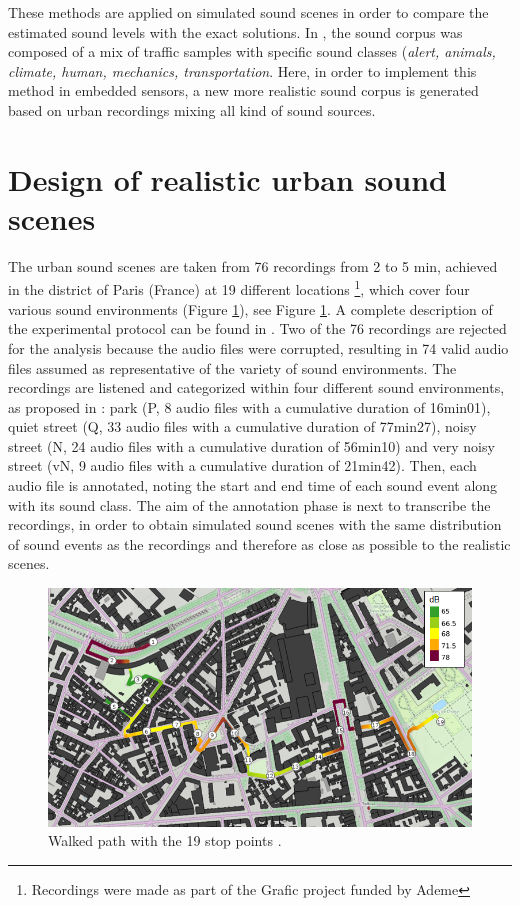 \documentclass[review,5p,twocolumn,sort&compress,times]{elsarticle}
\begin{document}
These methods are applied on simulated sound scenes in order to compare the estimated sound levels with the exact solutions. In \cite{}, the sound corpus was composed of a mix of traffic samples with specific sound classes (\textit{alert, animals, climate, human, mechanics, transportation}. Here, in order to implement this method in embedded sensors, a new more realistic sound corpus is generated based on urban recordings mixing all kind of sound sources.

\section{Design of realistic urban sound scenes}\label{part:urban_scene}

The urban sound scenes are taken from 76 recordings from 2 to 5 min, achieved in the  district of Paris (France) at 19 different locations \footnote{Recordings were made as part of the Grafic project funded by Ademe}, which cover four various sound environments (Figure \ref{fig:map_grafic}), see Figure \ref{fig:map_grafic}. A complete description of the experimental protocol can be found in \cite{aumond_modelling_2017}. Two of the 76 recordings are rejected for the analysis because the audio files were corrupted, resulting in 74 valid audio files assumed as representative of the variety of sound environments. The recordings are listened and categorized within four different sound environments, as proposed in \cite{can_describing_2015}: park (P, 8 audio files with a cumulative duration of 16min01), quiet street (Q, 33 audio files with a cumulative duration of 77min27), noisy street (N, 24 audio files with a cumulative duration of 56min10) and very noisy street (vN, 9 audio files with a cumulative duration of 21min42). Then, each audio file is annotated, noting the start and end time of each sound event along with its sound class. The aim of the annotation phase is next to transcribe the recordings, in order to obtain simulated sound scenes with the same distribution of sound events as the recordings and therefore as close as possible to the realistic scenes. 

\begin{figure}[t]
\centering
\includegraphics[width=\linewidth]{./figures/trajet_19pts.png}
\caption{Walked path with the 19 stop points  \cite{aumond_modelling_2017}.}
\label{fig:map_grafic}
\end{figure}
\end{document}

